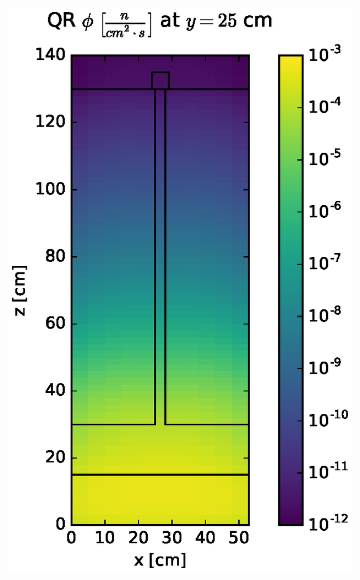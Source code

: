 \documentclass{article} %
\begin{document}
\begin{figure}[!htb]
\centering
\begin{subfigure}{0.4\textwidth}
\includegraphics[max height=0.445\textheight]
{img/steel-fwd-flux-qr04.eps}
\end{subfigure} ~
\begin{subfigure}{0.4\textwidth}

\end{subfigure}
\end{figure}
\end{document}
